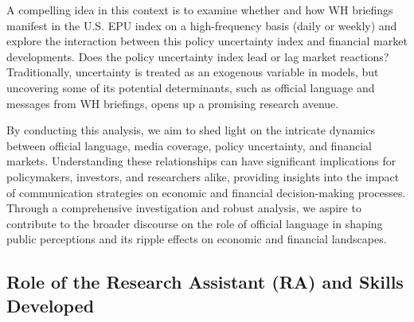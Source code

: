 \documentclass{article}
\begin{document}
\par
A compelling idea in this context is to examine whether and how WH briefings manifest in the U.S. EPU index on a high-frequency basis (daily or weekly) and explore the interaction between this policy uncertainty index and financial market developments. Does the policy uncertainty index lead or lag market reactions? Traditionally, uncertainty is treated as an exogenous variable in models, but uncovering some of its potential determinants, such as official language and messages from WH briefings, opens up a promising research avenue.
\par
By conducting this analysis, we aim to shed light on the intricate dynamics between official language, media coverage, policy uncertainty, and financial markets. Understanding these relationships can have significant implications for policymakers, investors, and researchers alike, providing insights into the impact of communication strategies on economic and financial decision-making processes. Through a comprehensive investigation and robust analysis, we aspire to contribute to the broader discourse on the role of official language in shaping public perceptions and its ripple effects on economic and financial landscapes.


\subsection{Role of the Research Assistant (RA) and Skills Developed}
\end{document}
